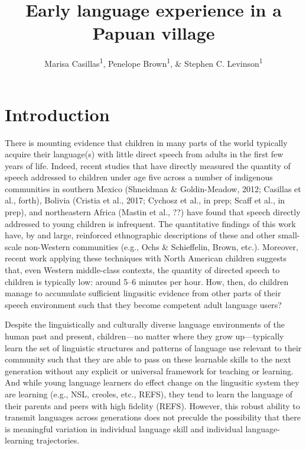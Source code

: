 \documentclass[floatsintext,man]{apa6}
\title{Early language experience in a Papuan village}
\author{Marisa Casillas\textsuperscript{1}, Penelope Brown\textsuperscript{1}, \& Stephen C. Levinson\textsuperscript{1}}
\affiliation{
    \vspace{0.5cm}
          \textsuperscript{1} Max Planck Institute for Psycholinguistics  }
\theoremstyle{definition}
\theoremstyle{definition}
\theoremstyle{definition}
\theoremstyle{remark}
\begin{document}
\maketitle

\setcounter{secnumdepth}{0}



\section{Introduction}\label{intro}

There is mounting evidence that children in many parts of the world
typically acquire their language(s) with little direct speech from
adults in the first few years of life. Indeed, recent studies that have
directly measured the quantity of speech addressed to children under age
five across a number of indigenous communities in southern Mexico
(Shneidman \& Goldin-Meadow, 2012; Casillas et al., forth), Bolivia
(Cristia et al., 2017; Cychosz et al., in prep; Scaff et al., in prep),
and northeastern Africa (Mastin et al., ??) have found that speech
directly addressed to young children is infrequent. The quantitative
findings of this work have, by and large, reinforced ethnographic
descriptions of these and other small-scale non-Western communities
(e.g., Ochs \& Schieffelin, Brown, etc.). Moreover, recent work applying
these techniques with North American children suggests that, even
Western middle-class contexts, the quantity of directed speech to
children is typically low: around 5--6 minutes per hour. How, then, do
children manage to accumulate sufficient lingusitic evidence from other
parts of their speech environment such that they become competent adult
language users?

Despite the linguistically and culturally diverse language environments
of the human past and present, children---no matter where they grow
up---typically learn the set of linguistic structures and patterns of
language use relevant to their community such that they are able to pass
on these learnable skills to the next generation without any explicit or
universal framework for teaching or learning. And while young language
learners do effect change on the lingusitic system they are learning
(e.g., NSL, creoles, etc., REFS), they tend to learn the language of
their parents and peers with high fidelity (REFS). However, this robust
ability to transmit languages across generations does not preculde the
possibility that there is meaningful variation in individual language
skill and individual language-learning trajectories.
\end{document}
